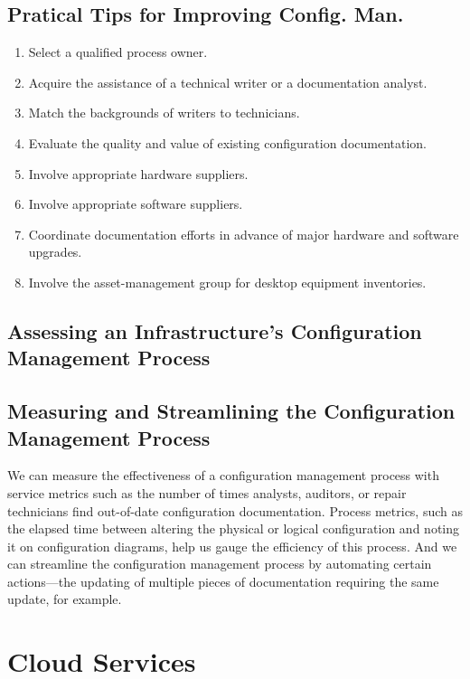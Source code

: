 \documentclass[8pt,a4]{extarticle}
\begin{document}
\begin{multicols}{3}
\subsection{Pratical Tips for Improving Config. Man.}
\begin{enumerate}
    \item Select a qualified process owner.
    \item Acquire the assistance of a technical writer or a documentation analyst.
    \item Match the backgrounds of writers to technicians.
    \item Evaluate the quality and value of existing configuration documentation.
    \item Involve appropriate hardware suppliers.
    \item Involve appropriate software suppliers.
    \item Coordinate documentation efforts in advance of major hardware and software upgrades.
    \item Involve the asset-management group for desktop equipment inventories.
\end{enumerate}

\subsection{Assessing an Infrastructure’s Configuration Management Process}
\subsection{Measuring and Streamlining the Configuration Management Process}
We can measure the effectiveness of a configuration management process with service metrics such as the number of times
analysts, auditors, or repair technicians find out-of-date configuration documentation. 
Process metrics, such as the elapsed time between altering the physical or logical configuration and noting it on 
configuration diagrams, help us gauge the efficiency of this process. 
And we can streamline the configuration management process by automating certain actions—the updating of multiple 
pieces of documentation requiring the same update, for example.

\section{Cloud Services}

\end{multicols}
\end{document}
